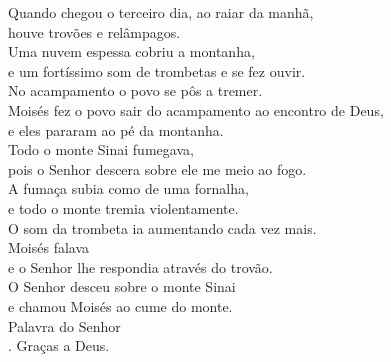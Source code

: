 \documentclass{book}
\begin{document}
\begin{flushleft}
    Quando chegou o terceiro dia, ao raiar da manhã, \\
    houve trovões e relâmpagos. \\
    Uma nuvem espessa cobriu a montanha, \\
    e um fortíssimo som de trombetas e se fez ouvir. \\
    No acampamento o povo se pôs a tremer. \\
    Moisés fez o povo sair do acampamento ao encontro de Deus, \\
    e eles pararam ao pé da montanha. \\
    Todo o monte Sinai fumegava, \\
    pois o Senhor descera sobre ele me meio ao fogo. \\
    A fumaça subia como de uma fornalha, \\
    e todo o monte tremia violentamente. \\
    O som da trombeta ia aumentando cada vez mais. \\
    Moisés falava \\
    e o Senhor lhe respondia através do trovão. \\
    O Senhor desceu sobre o monte Sinai \\
    e chamou Moisés ao cume do monte.
    \vspace{0.1cm} \\
    Palavra do Senhor \\
    {\color{red} \Rbar.} Graças a Deus.

    \newpage


\end{flushleft}
\end{document}

